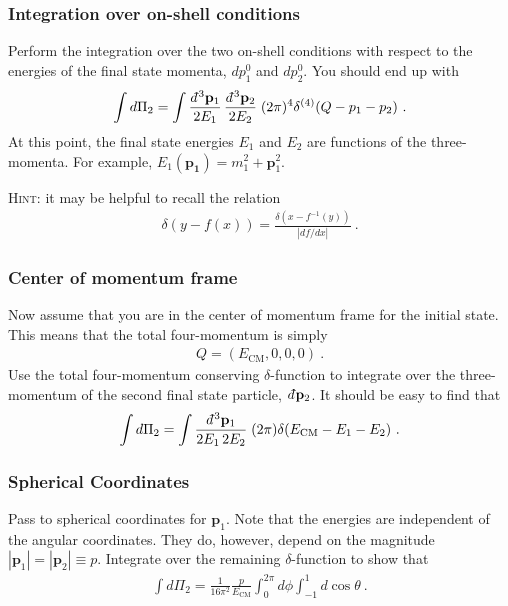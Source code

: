 \documentclass[12pt]{article}
\renewcommand{\vec}[1]{\mathbf{#1}} %
\newcommand{\dbar}{d\mkern-6mu\mathchar'26\hspace{-.1em}}    %
\begin{document}
\subsubsection{Integration over on-shell conditions}

Perform the integration over the two on-shell conditions with respect to the energies of the final state momenta, $dp_1^0$ and $dp_2^0$.  You should end up with
\begin{align}
	\int d\Pi_2 = 
	\int \frac{\dbar^3 \vec{p}_1}{2E_1} \, \frac{\dbar^3 \vec{p}_2}{2E_2}
	\;
	(2\pi)^4 \delta^{(4)}(Q-p_1-p_2) \ .
\end{align}
At this point, the final state energies $E_1$ and $E_2$ are functions of the three-momenta. For example, $E_1(\vec{p_1}) = m_1^2 + \vec{p}_1^2$.


\textsc{Hint:} it may be helpful to recall the relation
\begin{align}
	\delta(y-f(x)) = \frac{\delta(x-f^{-1}(y))}{|df/dx|} \ .
\end{align}

\subsubsection{Center of momentum frame}

Now assume that you are in the center of momentum frame for the initial state. This means that the total four-momentum is simply
\begin{align}
	Q = \left(E_\text{CM}, 0, 0, 0\right) \ .
\end{align}
Use the total four-momentum conserving $\delta$-function to integrate over the three-momentum of the second final state particle, $\dbar \vec{p}_2$. It should be easy to find that
\begin{align}
	\int d\Pi_2 = \int \frac{\dbar^3\vec{p}_1}{2E_1\, 2E_2} \;
	(2\pi)\delta(E_\text{CM} - E_1 - E_2) \ .
\end{align}

\subsubsection{Spherical Coordinates}

Pass to spherical coordinates for $\vec{p}_1$. Note that the energies are independent of the angular coordinates. They do, however, depend on the magnitude $|\vec{p}_1| = |\vec{p}_2| \equiv p$. Integrate over the remaining $\delta$-function to show that
\begin{align}
	\int d\Pi_2 = \frac{1}{16\pi^2}\frac{p}{E_\text{CM}} \int_0^{2\pi} d\phi \int_{-1}^1 d\cos\theta \ .
\end{align}
\end{document}
